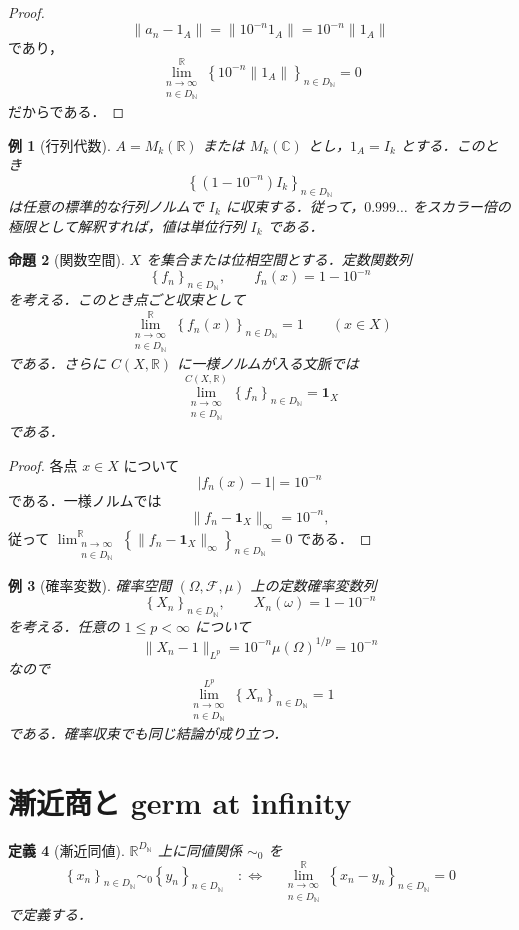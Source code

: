 \documentclass[a4paper,11pt]{ltjsarticle}
\theoremstyle{jpdef}
\newtheorem{definition}{定義}[section]
\newtheorem{example}[definition]{例}
\theoremstyle{jpthm}
\newtheorem{proposition}[definition]{命題}
\newcommand{\N}{\mathbb{N}}
\newcommand{\R}{\mathbb{R}}
\newcommand{\C}{\mathbb{C}}
\newcommand{\DN}{D_{\N}}
\newcommand{\seq}[2]{\left\{#1\right\}_{#2}}
\begin{document}
\begin{proof}
\[
  \|a_n-1_A\|=\|10^{-n}1_A\|=10^{-n}\|1_A\|
\]
であり，
\[
  \lim_{\substack{n\to\infty\\ n\in\DN}}^{\R}\seq{10^{-n}\|1_A\|}{n\in\DN}=0
\]
だからである．
\end{proof}

\begin{example}[行列代数]
\(A=M_k(\R)\) または \(M_k(\C)\) とし，\(1_A=I_k\) とする．このとき
\[
  \seq{(1-10^{-n})I_k}{n\in\DN}
\]
は任意の標準的な行列ノルムで \(I_k\) に収束する．従って，\(0.999\ldots\) をスカラー倍の極限として解釈すれば，値は単位行列 \(I_k\) である．
\end{example}

\begin{proposition}[関数空間]
\(X\) を集合または位相空間とする．定数関数列
\[
  \seq{f_n}{n\in\DN},
  \qquad
  f_n(x)=1-10^{-n}
\]
を考える．このとき点ごと収束として
\[
  \lim_{\substack{n\to\infty\\ n\in\DN}}^{\R}\seq{f_n(x)}{n\in\DN}=1
  \qquad(x\in X)
\]
である．さらに \(C(X,\R)\) に一様ノルムが入る文脈では
\[
  \lim_{\substack{n\to\infty\\ n\in\DN}}^{C(X,\R)}\seq{f_n}{n\in\DN}=\mathbf 1_X
\]
である．
\end{proposition}

\begin{proof}
各点 \(x\in X\) について
\[
  |f_n(x)-1|=10^{-n}
\]
である．一様ノルムでは
\[
  \|f_n-\mathbf1_X\|_\infty=10^{-n},
\]
従って \(\lim_{\substack{n\to\infty\\ n\in\DN}}^{\R}\seq{\|f_n-\mathbf1_X\|_\infty}{n\in\DN}=0\) である．
\end{proof}

\begin{example}[確率変数]
確率空間 \((\Omega,\mathcal F,\mu)\) 上の定数確率変数列
\[
  \seq{X_n}{n\in\DN},
  \qquad
  X_n(\omega)=1-10^{-n}
\]
を考える．任意の \(1\le p<\infty\) について
\[
  \|X_n-1\|_{L^p}=10^{-n}\mu(\Omega)^{1/p}=10^{-n}
\]
なので
\[
  \lim_{\substack{n\to\infty\\ n\in\DN}}^{L^p}\seq{X_n}{n\in\DN}=1
\]
である．確率収束でも同じ結論が成り立つ．
\end{example}

\section{漸近商と germ at infinity}

\begin{definition}[漸近同値]
\(\R^{\DN}\) 上に同値関係 \(\sim_0\) を
\[
  \seq{x_n}{n\in\DN}\sim_0\seq{y_n}{n\in\DN}
  \quad:\Longleftrightarrow\quad
  \lim_{\substack{n\to\infty\\ n\in\DN}}^{\R}\seq{x_n-y_n}{n\in\DN}=0
\]
で定義する．
\end{definition}
\end{document}
